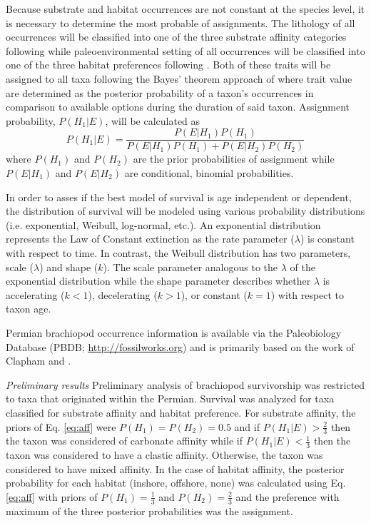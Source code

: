 \documentclass[12pt,letterpaper]{article}
\begin{document}
Because substrate and habitat occurrences are not constant at the species level, it is necessary to determine the most probable of assignments. The lithology of all occurrences will be classified into one of the three substrate affinity categories following \citet{Foote2006} while paleoenvironmental setting of all occurrences will be classified into one of the three habitat preferences following \citet{Kiessling2007}. Both of these traits will be assigned to all taxa following the Bayes' theorem approach of \citet{Simpson2009} where trait value are determined as the posterior probability of a taxon's occurrences in comparison to available options during the duration of said taxon. Assignment probability, \(P(H_{1}|E)\), will be calculated as
\begin{equation}
  P(H_{1}|E) = \frac{P(E|H_{1})P(H_{1})}{P(E|H_{1})P(H_{1}) + P(E|H_{2})P(H_{2})}
  \label{eq:aff}
\end{equation}
where \(P(H_{1})\) and \(P(H_{2})\) are the prior probabilities of assignment while \(P(E|H_{1})\) and \(P(E|H_{2})\) are conditional, binomial probabilities. 

In order to asses if the best model of survival is age independent or dependent, the distribution of survival will be modeled using various probability distributions (i.e. exponential, Weibull, log-normal, etc.). An exponential distribution represents the Law of Constant extinction as the rate parameter (\(\lambda\)) is constant with respect to time. In contrast, the Weibull distribution has two parameters, scale (\(\lambda\)) and shape (\(k\)). The scale parameter analogous to the \(\lambda\) of the exponential distribution while the shape parameter describes whether \(\lambda\) is accelerating (\(k < 1\)), decelerating (\(k > 1\)), or constant (\(k = 1\)) with respect to taxon age.

Permian brachiopod occurrence information is available via the Paleobiology Database (PBDB; \url{http://fossilworks.org}) and is primarily based on the work of Clapham \citep{Clapham2006,Clapham2008a,Clapham2007a,Clapham2012,Clapham2007} and \citet{Waterhouse1987}.


\textit{Preliminary results}
Preliminary analysis of brachiopod survivorship was restricted to taxa that originated within the Permian. Survival was analyzed for taxa classified for substrate affinity and habitat preference. For substrate affinity, the priors of Eq. \ref{eq:aff} were \(P(H_{1}) = P(H_{2}) = 0.5\) and if \(P(H_{1}|E) > \frac{2}{3}\) then the taxon was considered of carbonate affinity while if \(P(H_{1}|E) < \frac{1}{3}\) then the taxon was considered to have a clastic affinity. Otherwise, the taxon was considered to have mixed affinity. In the case of habitat affinity, the posterior probability for each habitat (inshore, offshore, none) was calculated using Eq. \ref{eq:aff} with priors of \(P(H_{1}) = \frac{1}{3}\) and \(P(H_{2}) = \frac{2}{3}\) and the preference with maximum of the three posterior probabilities was the assignment.
\end{document}
